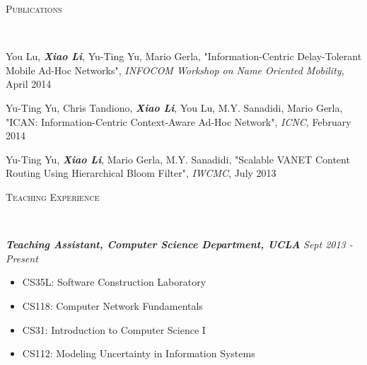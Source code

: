 \documentclass[9pt]{article}
\newenvironment{changemargin}[2]{%
  \begin{list}{}{%
    \setlength{\topsep}{0pt}%
    \setlength{\leftmargin}{#1}%
    \setlength{\rightmargin}{#2}%
    \setlength{\listparindent}{\parindent}%
    \setlength{\itemindent}{\parindent}%
    \setlength{\parsep}{\parskip}%
  }%
  \item[]}{\end{list}
  }
\newcommand{\lineover}{
  \begin{changemargin}{-0.05in}{-0.05in}
  \vspace*{-8pt}
  \hrulefill \\
  \vspace*{-2pt}
  \end{changemargin}
  }
\newcommand{\header}[1]{
  \begin{changemargin}{-0.5in}{-0.5in}
  \scshape{#1}\\
  \lineover
  \end{changemargin}
  }
\newenvironment{body} {
  \vspace*{-16pt}
  \begin{changemargin}{-0.25in}{-0.5in}
  }
  {\end{changemargin}
  }
\begin{document}
\smallskip



\header{Publications}
\begin{body}
\vspace{14pt}
  \begin{enumerate}[leftmargin=0.25in,label={[\arabic*]}]
    \item
    You Lu, \textbf{\emph{Xiao Li}}, Yu-Ting Yu, Mario Gerla,
    "Information-Centric Delay-Tolerant Mobile Ad-Hoc Networks",
    \emph{INFOCOM Workshop on Name Oriented Mobility}, April 2014
    \item
    Yu-Ting Yu, Chris Tandiono, \textbf{\emph{Xiao Li}}, You Lu,
    M.Y. Sanadidi, Mario Gerla, "ICAN: Information-Centric Context-Aware
    Ad-Hoc Network", \emph{ICNC}, February 2014
    \item
    Yu-Ting Yu, \textbf{\emph{Xiao Li}}, Mario Gerla, M.Y. Sanadidi,
    "Scalable VANET Content Routing Using Hierarchical Bloom Filter",
    \emph{IWCMC}, July 2013
  \end{enumerate}
\end{body}

\smallskip



\header{Teaching Experience}

\begin{body}
\vspace{14pt}
\emph{\textbf{Teaching Assistant, Computer Science Department, UCLA}}
\hfill \emph{Sept 2013 - Present}\\
\vspace*{-4pt}
  \begin{itemize} \itemsep -0pt
    \item CS35L: Software Construction Laboratory
    \item CS118: Computer Network Fundamentals
    \item CS31: Introduction to Computer Science I
    \item CS112: Modeling Uncertainty in Information Systems
  \end{itemize}
\end{body}
\end{document}
